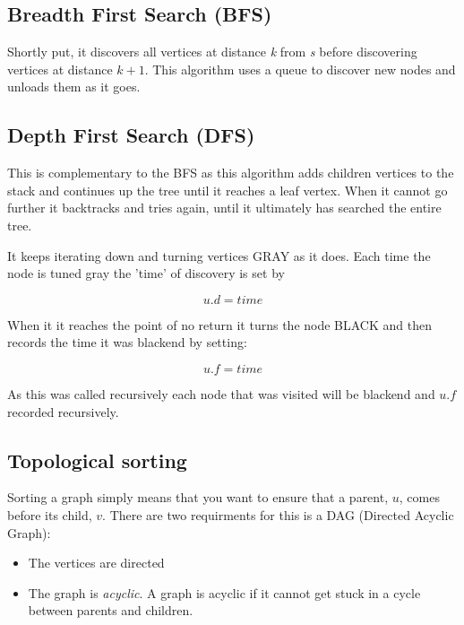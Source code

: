 \subsection{Breadth First Search (BFS)}

Shortly put, it discovers all vertices at distance \emph{k} from \emph{s} before discovering vertices at distance $k+1$.
This algorithm uses a queue to discover new nodes and unloads them as it goes.

\subsection{Depth First Search (DFS)}

This is complementary to the BFS as this algorithm adds children vertices to the stack and continues up the tree until it reaches a leaf vertex. When it cannot go further it backtracks and tries again, until it ultimately has searched the entire tree. 

It keeps iterating down and turning vertices GRAY as it does. Each time the node is tuned gray the 'time' of discovery is set by 

\begin{equation}
    u.d = time
\end{equation}

When it it reaches the point of no return it turns the node BLACK and then records the time it was blackend by setting: 

\begin{equation}
    u.f = time
\end{equation}

As this was called recursively each node that was visited will be blackend and $u.f$ recorded recursively.

\subsection{Topological sorting}

Sorting a graph simply means that you want to ensure that a parent, $u$, comes before its child, $v$. There are two requirments for this is a DAG (Directed Acyclic Graph):

\begin{itemize}
    \item The vertices are directed
    \item The graph is \emph{acyclic}. A graph is acyclic if it cannot get stuck in a cycle between parents and children.
\end{itemize}

